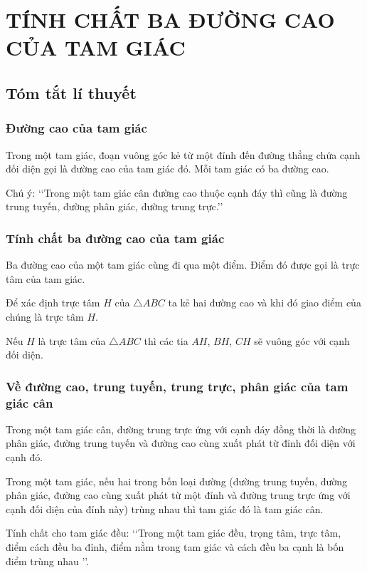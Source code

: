 
\section{TÍNH CHẤT BA ĐƯỜNG CAO CỦA TAM GIÁC}
\subsection{Tóm tắt lí thuyết}
\subsubsection{Đường cao của tam giác}
\begin{dn}
 Trong một tam giác, đoạn vuông góc kẻ từ một đỉnh đến đường thẳng chứa cạnh đối diện gọi là đường cao của tam giác đó.
Mỗi tam giác có ba đường cao.
\end{dn}
\begin{note}
Chú ý: \lq\lq Trong một tam giác cân đường cao thuộc cạnh đáy thì cũng là đường trung tuyến, đường phân giác, đường trung trực.\rq\rq
\end{note}
\subsubsection{Tính chất ba đường cao của tam giác}
\begin{tc}
Ba đường cao của một tam giác cùng đi qua một điểm. Điểm đó được gọi là trực tâm của tam giác.
\end{tc}
\begin{nx} 
Để xác định trực tâm $H$ của $\triangle ABC$ ta kẻ hai đường cao và khi đó giao điểm của chúng là trực tâm $H$.
\end{nx}
\begin{nx} 
	Nếu $H$ là trực tâm của $\triangle ABC$ thì các tia $AH$, $BH$, $CH$ sẽ vuông góc với cạnh đối diện.
\end{nx}
\subsubsection{Về đường cao, trung tuyến, trung trực, phân giác của tam giác cân}
\begin{dl}
	Trong một tam giác cân, đường trung trực ứng với cạnh đáy đồng thời là đường phân giác, đường trung tuyến và đường cao cùng xuất phát từ đỉnh đối diện với cạnh đó.
	\end{dl}
\begin{nx}
Trong một tam giác, nếu hai trong bốn
loại đường (đường trung tuyến, đường 
phân giác, đường cao cùng xuất phát từ 
một đỉnh và đường trung trực ứng với 
cạnh đối diện của đỉnh này) trùng nhau 
thì tam giác đó là tam giác cân.
\end{nx}
\begin{tc}
	Tính chất cho tam giác đều: \lq\lq Trong một tam giác đều, trọng tâm, trực tâm, điểm cách đều ba đỉnh, điểm nằm trong tam giác và cách đều ba cạnh là bốn điểm trùng nhau \rq\rq.
\end{tc}
